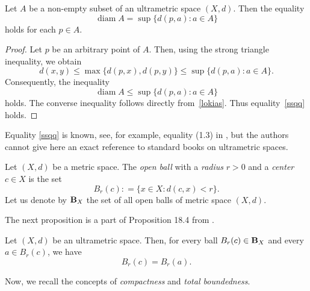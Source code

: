\documentclass{article}
\begin{document}
\begin{Lemma}\label{nnhh}
Let $A$ be a non-empty subset of an ultrametric space $(X,d)$. Then the equality
\begin{equation}\label{ssqq}
\operatorname{diam} A=\sup\{d(p,a): a\in A\}
\end{equation}
holds for each $p\in A$.
\end{Lemma}



\begin{proof}
Let $p$ be an arbitrary point of $A$. Then, using the strong triangle inequality, we obtain
\[
d(x,y)\leq \max\{d(p,x),d(p,y)\}\leq \sup\{d(p,a)\colon a\in A\}.
\]
Consequently, the inequality
\[
\operatorname{diam} A \leq \sup\{d(p,a)\colon a\in A\}
\]
holds.
The converse inequality follows directly from~\eqref{lokias}. Thus equality~\eqref{ssqq} holds.
\end{proof}



\begin{Remark}
Equality \eqref{ssqq} is known, see, for example, equality (1.3) in \cite{Dov2019pNUAA}, but the authors cannot give here an exact reference to standard books on ultrametric spaces.
\end{Remark}












Let \((X, d)\) be a metric space. The \emph{open ball} with a \emph{radius} \(r > 0\) and a \emph{center} \(c \in X\) is the set
\begin{equation}
    \label{02}
B_r(c): = \{x \in X \colon d(c, x) < r\}.
\end{equation}
Let us denote by ${\bf B}_X$ the set of all open balls of metric space $(X,d)$.



The next proposition is a part of Proposition 18.4 from \cite{Sch1985}.



\begin{Proposition}
    \label{dj}
 Let $(X,d)$ be an ultrametric space. Then, for every ball $B_r(c) \in {\bf B}_X$ and every $a \in B_r(c)$, we have
\[
B_r(c) = B_r(a).
\]
\end{Proposition}




Now, we recall the concepts of \emph{compactness} and \emph{total boundedness}.
\end{document}
